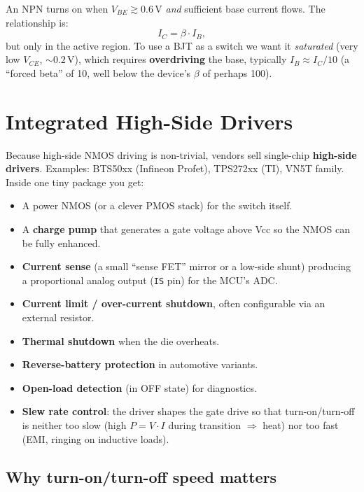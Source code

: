 \documentclass[11pt,a4paper]{article}
\begin{document}
An NPN turns on when $V_{BE} \gtrsim 0.6$\,V \emph{and} sufficient base
current flows. The relationship is:
\[
I_C = \beta \cdot I_B,
\]
but only in the active region. To use a BJT as a switch we want it
\emph{saturated} (very low $V_{CE}$, $\sim 0.2$\,V), which requires
\textbf{overdriving} the base, typically $I_B \approx I_C / 10$ (a
``forced beta'' of 10, well below the device's $\beta$ of perhaps 100).

\section{Integrated High-Side Drivers}

Because high-side NMOS driving is non-trivial, vendors sell single-chip
\textbf{high-side drivers}. Examples: BTS50xx (Infineon Profet), TPS272xx
(TI), VN5T family. Inside one tiny package you get:

\begin{itemize}[leftmargin=*]
    \item A power NMOS (or a clever PMOS stack) for the switch itself.
    \item A \textbf{charge pump} that generates a gate voltage above Vcc
    so the NMOS can be fully enhanced.
    \item \textbf{Current sense} (a small ``sense FET'' mirror or a low-side
    shunt) producing a proportional analog output (\texttt{IS} pin) for the
    MCU's ADC.
    \item \textbf{Current limit / over-current shutdown}, often configurable
    via an external resistor.
    \item \textbf{Thermal shutdown} when the die overheats.
    \item \textbf{Reverse-battery protection} in automotive variants.
    \item \textbf{Open-load detection} (in OFF state) for diagnostics.
    \item \textbf{Slew rate control}: the driver shapes the gate drive so
    that turn-on/turn-off is neither too slow (high $P = V \cdot I$ during
    transition $\Rightarrow$ heat) nor too fast (EMI, ringing on inductive
    loads).
\end{itemize}

\subsection{Why turn-on/turn-off speed matters}
\end{document}
